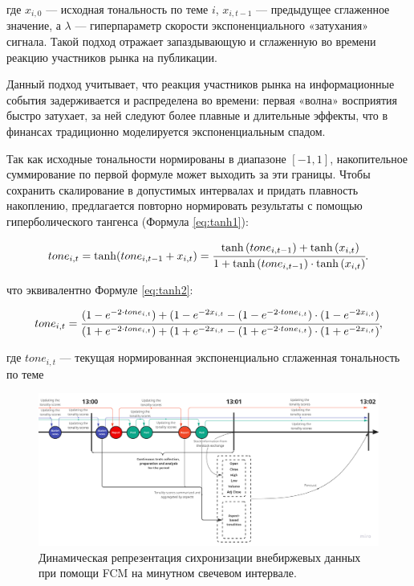 где $x_{i, 0}$ --- исходная тональность по теме $i$, $x_{i,t-1}$ --- предыдущее сглаженное значение,
а $\lambda$ --- гиперпараметр скорости экспоненциального «затухания» сигнала. Такой подход отражает
запаздывающую и сглаженную во времени реакцию участников рынка на публикации.

Данный подход учитывает, что реакция участников рынка на информационные события задерживается и распределена
во времени: первая «волна» восприятия быстро затухает, за ней следуют более плавные и длительные эффекты,
что в финансах традиционно моделируется экспоненциальным спадом.

Так как исходные тональности нормированы в диапазоне $[-1,1]$, накопительное суммирование по первой формуле
может выходить за эти границы. Чтобы сохранить скалирование в допустимых интервалах и придать плавность
накоплению, предлагается повторно нормировать результаты с помощью гиперболического тангенса (Формула \ref{eq:tanh1}):

\begin{equation}\label{eq:tanh1}
    tone_{i, t} = \tanh(tone_{i, t-1} + x_{i,t}) =
    \cfrac{
        \tanh{(tone_{i, t-1})} + \tanh{(x_{i,t})}
    }{
        1 + \tanh{(tone_{i, t-1})} \cdot \tanh{(x_{i,t})}
    }.
\end{equation}

что эквивалентно Формуле \ref{eq:tanh2}:

\begin{equation}\label{eq:tanh2}
    tone_{i, t} =
    \cfrac{
        (1-e^{-2 \cdot tone_{i, t}})+(1-e^{-2x_{i,t}} - (1-e^{-2 \cdot tone_{i, t}}) \cdot(1-e^{-2x_{i,t}})
    }{
        (1+e^{-2 \cdot tone_{i, t}})+(1+e^{-2x_{i,t}} - (1+e^{-2 \cdot tone_{i, t}}) \cdot(1+e^{-2x_{i,t}})
    },
\end{equation}

где $tone_{i, t}$ --- текущая нормированная экспоненциально сглаженная тональность по теме

\begin{figure}[H]
    \centering
    \includegraphics[width=1\linewidth]{img/feature_caching_mechanism.png}
    \caption{Динамическая репрезентация сихронизации внебиржевых данных при помощи FCM на минутном свечевом интервале.}
    \label{fig:feature_caching_mechanism}
\end{figure}

